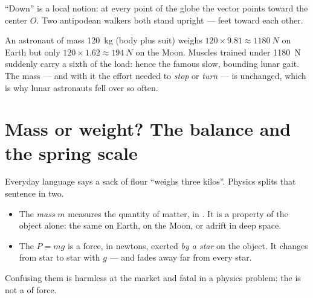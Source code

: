 \begin{omfigure}

{\small ``Down'' is a local notion: at every point of the globe the
 vector points toward the center $O$. Two antipodean walkers both
stand upright --- feet toward each other.}
\end{omfigure}

\begin{remark}\label{rem:g10:universal-gravitation:bounce}
An astronaut of mass \qty{120}{kg} (body plus suit) weighs
$120 \times 9.81 \approx \qty{1180}{N}$ on Earth but only
$120 \times 1.62 \approx \qty{194}{N}$ on the Moon. Muscles trained
under \qty{1180}{N} suddenly carry a sixth of the load: hence the
famous slow, bounding lunar gait. The mass --- and with it the effort
needed to \emph{stop} or \emph{turn} --- is unchanged, which is why
lunar astronauts fell over so often.
\end{remark}

\section{Mass or weight? The balance and the spring scale}

Everyday language says a sack of flour ``weighs three kilos''. Physics
splits that sentence in two.

\begin{remark}\label{rem:g10:universal-gravitation:massweight}
\begin{itemize}
  \item The \emph{mass} $m$ measures the quantity of matter, in
        . It is a property of the object alone: the same on
        Earth, on the Moon, or adrift in deep space.
  \item The \emph{} $P = mg$ is a force, in newtons, exerted
        \emph{by a star} on the object. It changes from star to star
        with $g$ --- and fades away far from every star.
\end{itemize}
Confusing them is harmless at the market and fatal in a physics
problem: the  is not a  of force.
\end{remark}

